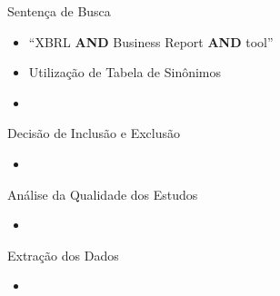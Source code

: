 \documentclass[t,14pt,mathserif]{beamer}
\begin{document}
\begin{frame}{Sentença de Busca}
\begin{itemize}
    \item ``XBRL \textbf{AND} Business Report \textbf{AND} tool''
    \item Utilização de Tabela de Sinônimos
    \item

\end{itemize}
\begin{table}[ht]
\centering
{}
\caption{Dicionário de Sinônimos}
\label{tab:dicionario}
\end{table}

\end{frame}

\begin{frame}{Decisão de Inclusão e Exclusão}
    \begin{itemize}
      \item
    \end{itemize}
\end{frame}

\begin{frame}{Análise da Qualidade dos Estudos}
    \begin{itemize}
      \item
    \end{itemize}
\end{frame}

\begin{frame}{Extração dos Dados}
    \begin{itemize}
      \item
    \end{itemize}
\end{frame}
\end{document}
